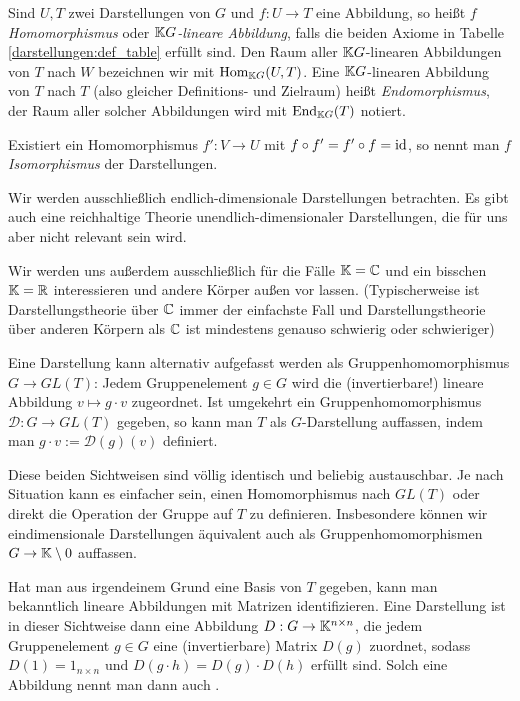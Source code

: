 \begin{definition}[Darstellungen]
Sind $U,T$ zwei Darstellungen von $G$ und $f: U\to T$ eine Abbildung, so heißt $f$ \emph{Homomorphismus} oder \emph{$\mathbb{K} G$-lineare Abbildung}, falls die beiden Axiome in Tabelle \ref{darstellungen:def_table} erfüllt sind. Den Raum aller $\mathbb{K} G$-linearen Abbildungen von $T$ nach $W$ bezeichnen wir mit $\operatorname{Hom}_{\mathbb{K} G}(U,T)$. Eine $\mathbb{K} G$-linearen Abbildung von $T$ nach $T$ (also gleicher Definitions- und Zielraum) heißt \emph{Endomorphismus}, der Raum aller solcher Abbildungen wird mit $\operatorname{End}_{\mathbb{K} G}(T)$ notiert.

Existiert ein Homomorphismus $f': V\to U$ mit $f\circ f'=f'\circ f=\operatorname{id}$, so nennt man $f$ \emph{Isomorphismus} der Darstellungen.
\end{definition}

\begin{convention}
Wir werden ausschließlich endlich-dimensionale Darstellungen betrachten. Es gibt auch eine reichhaltige Theorie unendlich-dimensionaler Darstellungen, die für uns aber nicht relevant sein wird.

Wir werden uns außerdem ausschließlich für die Fälle $\mathbb{K}=\mathbb{C}$ und ein bisschen $\mathbb{K}=\mathbb{R}$ interessieren und andere Körper außen vor lassen. (Typischerweise ist Darstellungstheorie über $\mathbb{C}$ immer der einfachste Fall und Darstellungstheorie über anderen Körpern als $\mathbb{C}$ ist mindestens genauso schwierig oder schwieriger)
\end{convention}

\begin{remark}
Eine Darstellung kann alternativ aufgefasst werden als Gruppenhomomorphismus $G\to GL(T)$: Jedem Gruppenelement $g\in G$ wird die (invertierbare!) lineare Abbildung $v\mapsto g\cdot v$ zugeordnet. Ist umgekehrt ein Gruppenhomomorphismus $\mathcal{D}: G\to GL(T)$ gegeben, so kann man $T$ als $G$-Darstellung auffassen, indem man $g\cdot v:=\mathcal{D}(g)(v)$ definiert.

\smallbreak
Diese beiden Sichtweisen sind völlig identisch und beliebig austauschbar. Je nach Situation kann es einfacher sein, einen Homomorphismus nach $GL(T)$ oder direkt die Operation der Gruppe auf $T$ zu definieren. Insbesondere können wir eindimensionale Darstellungen äquivalent auch als Gruppenhomomorphismen $G\to\mathbb{K}\setminus{0}$ auffassen.

\medbreak
Hat man aus irgendeinem Grund eine Basis von $T$ gegeben, kann man bekanntlich lineare Abbildungen mit Matrizen identifizieren. Eine Darstellung ist in dieser Sichtweise dann eine Abbildung ${D}: G\to \mathbb{K}^{n\times n}$, die jedem Gruppenelement $g\in G$ eine (invertierbare) Matrix $D(g)$ zuordnet, sodass $D(1)=1_{n\times n}$ und $D(g\cdot h)=D(g)\cdot D(h)$ erfüllt sind. Solch eine Abbildung nennt man dann auch .
\end{remark}

